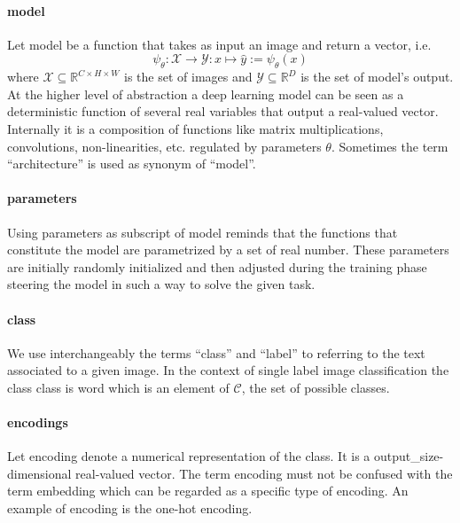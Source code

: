 \paragraph{model} Let \gls{model} be a function that takes as input an image
and return a vector, i.e.
\begin{equation}
  \psi_\theta: \mathcal{X} \to \mathcal{Y}
             : x \mapsto \hat{y} := \psi_\theta \left(x\right)
  \label{eq:model}
\end{equation}
where $\mathcal{X} \subseteq \mathbb{R}^{C \times H \times W}$ is the set of
images and $\mathcal{Y} \subseteq \mathbb{R}^{D}$ is the set of model's output.
At the higher level of abstraction a deep learning model can be seen as a
deterministic function of several real variables that output a real-valued
vector. Internally it is a composition of functions like matrix
multiplications, convolutions, non-linearities, etc. regulated by parameters
$\theta$. Sometimes the term ``architecture'' is used as synonym of ``model''.

\paragraph{parameters} Using \gls{parameters} as subscript of \gls{model}
reminds that the functions that constitute the model are parametrized by a set
of real number. These parameters are initially randomly initialized and then
adjusted during the training phase steering the model in such a way to solve
the given task.

\paragraph{class} We use interchangeably the terms ``class'' and ``label'' to
referring to the text associated to a given image. In the context of single
label image classification the class \gls{class} is word which is an element of
$\mathcal{C}$, the set of possible classes.

\paragraph{encodings} Let \gls{encoding} denote a numerical representation of
the class. It is a \gls{output_size}-dimensional real-valued vector. The term
encoding must not be confused with the term embedding which can be regarded as
a specific type of encoding. An example of encoding is the one-hot encoding.

